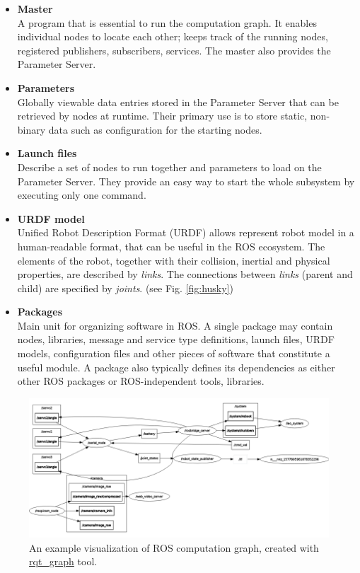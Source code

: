 \documentclass[english,inz,shortabstract]{iithesis}
\begin{document}
\begin{itemize}
        \item \textbf{Master}\\
        A program that is essential to run the computation graph. It enables individual nodes to locate each other; keeps track of the running nodes, registered publishers, subscribers, services. The master also provides the Parameter Server.  
        \item \textbf{Parameters}\\
        Globally viewable data entries stored in the Parameter Server that can be retrieved by nodes at runtime. Their primary use is to store static, non-binary data such as configuration for the starting nodes.
        \item \textbf{Launch files}\\
        Describe a set of nodes to run together and parameters to load on the Parameter Server. They provide an easy way to start the whole subsystem by executing only one command. 
        \item \textbf{URDF model}\\
        Unified Robot Description Format (URDF) allows represent robot model in a human-readable format, that can be useful in the ROS ecosystem. The elements of the robot, together with their collision, inertial and physical properties, are described by \textit{links}. The connections between \textit{links} (parent and child) are specified by \textit{joints}. (see Fig. \ref{fig:husky}) 
        \item \textbf{Packages}\\
        Main unit for organizing software in ROS. A single package may contain nodes, libraries, message and service type definitions, launch files, URDF models, configuration files and other pieces of software that constitute a useful module. A package also typically defines its dependencies as either other ROS packages or ROS-independent tools, libraries.

    \end{itemize}

    \begin{figure}[ht]
        \centering
        \captionsetup{margin=2cm}
        \includegraphics[width=\textwidth]{img/rqt_graph.png}
        \caption{An example visualization of ROS computation graph, created with  \href{http://wiki.ros.org/rqt_graph}{rqt\_graph} tool.}
        \label{fig:ros_graph}
    \end{figure}
\end{document}
